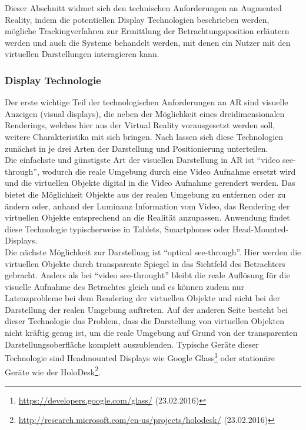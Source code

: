 Dieser Abschnitt widmet sich den technischen Anforderungen an Augmented Reality, indem die potentiellen Display Technologien beschrieben werden, mögliche Trackingverfahren zur Ermittlung der Betrachtungsposition erläutern werden und auch die Systeme behandelt werden, mit denen ein Nutzer mit den virtuellen Darstellungen interagieren kann.\\

\subsubsection{Display Technologie}

Der erste wichtige Teil der technologischen Anforderungen an AR sind visuelle Anzeigen (visual displays), die neben der Möglichkeit eines dreidimensionalen Renderings, welches hier aus der Virtual Reality vorausgesetzt werden soll, weitere Charakteristika mit sich bringen. Nach \citet{van2010survey} lassen sich diese Technologien zunächst in je drei Arten der Darstellung und Positionierung unterteilen.\\

Die einfachste und günstigste Art der visuellen Darstellung in AR ist \enquote{video see-through}, wodurch die reale Umgebung durch eine Video Aufnahme ersetzt wird und die virtuellen Objekte digital in die Video Aufnahme gerendert werden. Das bietet die Möglichkeit Objekte aus der realen Umgebung zu entfernen oder zu ändern oder, anhand der Luminanz Information vom Video, das Rendering der virtuellen Objekte entsprechend an die Realität anzupassen. Anwendung findet diese Technologie typischerweise in Tablets, Smartphones oder Head-Mounted-Displays.\\

Die nächste Möglichkeit zur Darstellung ist \enquote{optical see-through}. Hier werden die virtuellen Objekte durch transparente Spiegel in das Sichtfeld des Betrachters gebracht. Anders als bei \enquote{video see-throught} bleibt die reale Auflösung für die visuelle Aufnahme des Betrachtes gleich und es können zudem nur Latenzprobleme bei dem Rendering der virtuellen Objekte und nicht bei der Darstellung der realen Umgebung auftreten. Auf der anderen Seite besteht bei dieser Technologie das Problem, dass die Darstellung von virtuellen Objekten nicht kräftig genug ist, um die reale Umgebung auf Grund von der transparenten Darstellungsoberfläche komplett auszublenden. Typische Geräte dieser Technologie sind Headmounted Displays wie Google Glass\footnote{\url{https://developers.google.com/glass/} (23.02.2016)} oder stationäre Geräte wie der HoloDesk\footnote{\url{http://research.microsoft.com/en-us/projects/holodesk/} (23.02.2016)}.\\

